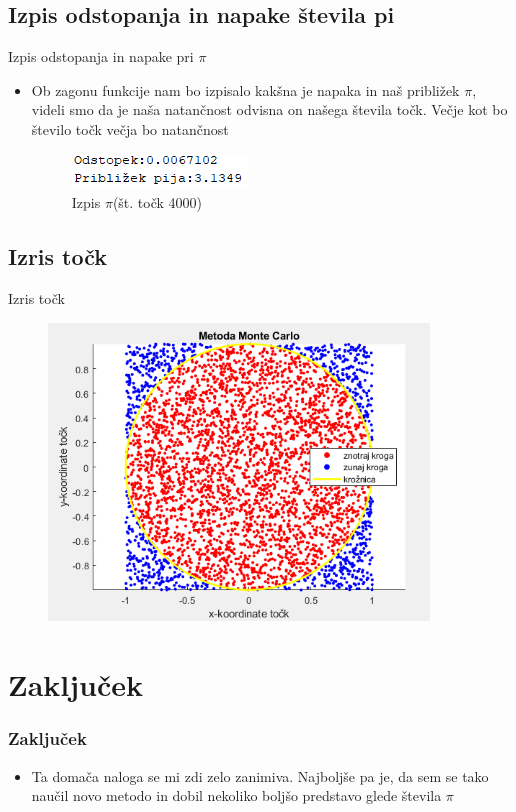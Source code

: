 \documentclass{beamer}
\begin{document}
\subsection{Izpis odstopanja in napake števila pi}
 \begin{frame}{Izpis odstopanja in napake pri $\pi$}
     \begin{itemize}
         \item Ob zagonu funkcije nam bo izpisalo kakšna je napaka in naš približek $\pi$, videli smo da je naša natančnost odvisna on našega števila točk. Večje kot bo število točk večja bo natančnost
         \begin{figure}
             \centering
             \includegraphics{Slike/izris.png}
             \caption{Izpis $\pi$(št. točk 4000)}
             \label{fig:Slika1}
         \end{figure}
     \end{itemize}
 \end{frame}

 \subsection{Izris točk}
 \begin{frame}{Izris točk}
 \begin{figure}
     \centering
     \includegraphics[width=0.9\textwidth]{Slike/tocke.png}
     \label{fig:Slika2}
 \end{figure}
     
 \end{frame}


\section{Zaključek}
\begin{frame}
  \frametitle{Zaključek}
  \begin{itemize}
    \item Ta domača naloga se mi zdi zelo zanimiva. Najboljše pa je, da sem se tako naučil novo metodo in dobil nekoliko boljšo predstavo glede števila $\pi$
  \end{itemize}
\end{frame}
\end{document}
